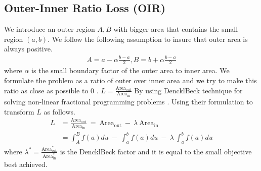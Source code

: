 \subsection{Outer-Inner Ratio Loss (OIR)}
We introduce an outer region $A,B$ with bigger area that contains the small region $(a,b)$. We follow the following assumption to insure that outer area is always positive.
\begin{equation}
\begin{aligned} 
 A =  a - \alpha \frac{b-a}{2} ,  B =  b + \alpha \frac{b-a}{2}  
\label{eq:fixed-assumption}
\end{aligned}
\end{equation}
where $\alpha$ is the small boundary factor of the outer area to inner area. We formulate the problem as a ratio of outer over inner area and we try to make this ratio as close as possible to 0 . 
$L =  \frac{\text{Area}_{\text{out}}}{\text{Area}_{\text{in}}}  $
By using DencklBeck technique for solving non-linear fractional programming problems \cite{dinckl}. Using their formulation to transform $L$ as follows.
\begin{equation}
\begin{aligned} 
L &= \frac{\text{Area}_{\text{out}}}{\text{Area}_{\text{in}}} ~ =~ \text{Area}_{\text{out}} ~-~ \lambda ~ \text{Area}_{\text{in}} \\
&= \int_{A}^{B}f(a)du ~ -~ \int_{a}^{b}f(a)du ~ -~ \lambda ~\int_{a}^{b}f(a)du
\label{eq:loss-oir-sup}
\end{aligned}
\end{equation}
where $\lambda^{*} = \frac{\text{Area}_{\text{out}}^{*}}{\text{Area}_{\text{in}}^{*}}$ is the DencklBeck factor and it is equal to the small objective best achieved.


